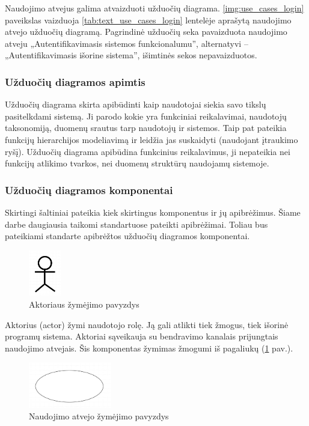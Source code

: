 Naudojimo atvejus galima atvaizduoti užduočių diagrama. \ref{img:use_cases_login} paveikslas vaizduoja \ref{tab:text_use_cases_login} lentelėje aprašytą naudojimo atvejo užduočių diagramą. Pagrindinė užduočių seka pavaizduota naudojimo atveju „Autentifikavimasis sistemos funkcionalumu”,  alternatyvi – „Autentifikavimasis išorine sistema”, išimtinės sekos nepavaizduotos.


\subsubsection{Užduočių diagramos apimtis}
Užduočių diagrama skirta apibūdinti kaip naudotojai siekia savo tikslų pasitelkdami sistemą. Ji parodo kokie yra funkciniai reikalavimai, naudotojų taksonomiją, duomenų srautus tarp naudotojų ir sistemos. Taip pat pateikia funkcijų hierarchijos modeliavimą ir leidžia jas suskaidyti (naudojant įtraukimo ryšį). Užduočių diagrama apibūdina funkcinius reikalavimus, ji nepateikia nei funkcijų atlikimo tvarkos, nei duomenų struktūrų naudojamų sistemoje.

\subsubsection{Užduočių diagramos komponentai} \label{section:use_cases_components}
Skirtingi šaltiniai pateikia kiek skirtingus komponentus ir jų apibrėžimus. Šiame darbe daugiausia taikomi \OMG{} standartuose pateikti apibrėžimai. Toliau bus pateikiami \UML{} standarte apibrėžtos užduočių diagramos komponentai.

\begin{figure}[H]
	\centering
	\includegraphics[height=2cm]{img/use_case_components/actor}
	\caption{Aktoriaus žymėjimo pavyzdys}
	\label{img:use_case_components_actor}
\end{figure}

Aktorius (actor) žymi naudotojo rolę. Ją gali atlikti tiek žmogus, tiek išorinė programų sistema. Aktoriai sąveikauja su bendravimo kanalais prijungtais naudojimo atvejais. Šis komponentas žymimas žmogumi iš pagaliukų (\ref{img:use_case_components_actor} pav.).

\begin{figure}[H]
	\centering
	\includegraphics[height=2cm]{img/use_case_components/use_case}
	\caption{Naudojimo atvejo žymėjimo pavyzdys}
	\label{img:use_case_components_use_case}
\end{figure}

